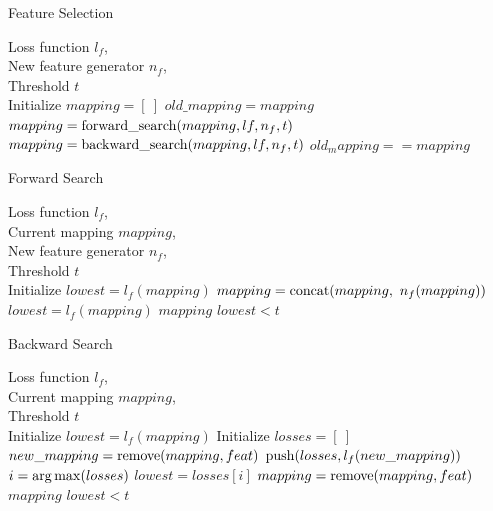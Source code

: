 \documentclass{article}
\begin{document}
\begin{algorithm}[tb]
   \caption{Feature Selection}
   \label{alg:featureselection}
\begin{algorithmic}
    Loss function $l_f$, \\
   \quad \quad \quad New feature generator $n_f$, \\
   \quad \quad \quad Threshold $t$ \\
   \STATE Initialize $mapping = [ \ ]$
   \REPEAT
   \STATE $old\_mapping = mapping$
   \STATE $mapping = {\rm forward\_search}(mapping, lf, n_f, t)$
   \STATE $mapping = {\rm backward\_search}(mapping, lf, n_f, t)$
   \UNTIL $old_mapping == mapping$
\end{algorithmic}
\end{algorithm}

\begin{algorithm}[tb]
   \caption{Forward Search}
   \label{alg:forwardsearch}
\begin{algorithmic}
    Loss function $l_f$, \\
   \quad \quad \quad Current mapping $mapping$, \\
   \quad \quad \quad New feature generator $n_f$, \\
   \quad \quad \quad Threshold $t$ \\
   \STATE Initialize $lowest = l_f(mapping)$
   \REPEAT
   \STATE $mapping = {\rm concat}(mapping, \ n_f(mapping))$
   \STATE $lowest = l_f(mapping)$
   \ELSE
    $mapping$
   \ENDIF
   \UNTIL $lowest < t$
\end{algorithmic}
\end{algorithm}

\begin{algorithm}[tb]
   \caption{Backward Search}
   \label{alg:backwardsearch}
\begin{algorithmic}
    Loss function $l_f$, \\
   \quad \quad \quad Current mapping $mapping$, \\
   \quad \quad \quad Threshold $t$ \\
   \STATE Initialize $lowest = l_f(mapping)$
   \REPEAT
   \STATE Initialize $losses = [ \ ]$
   \STATE $new\_mapping = {\rm remove}(mapping, feat)$
   \STATE ${\rm push}(losses, l_f(new\_mapping))$
   \ENDFOR
   \STATE $i = {\rm arg\,max}(losses)$
   \STATE $lowest = losses[i]$
   \STATE $mapping = {\rm remove}(mapping, feat)$
   \ELSE
    $mapping$
   \ENDIF
   \UNTIL $lowest < t$
\end{algorithmic}
\end{algorithm}
\end{document}
